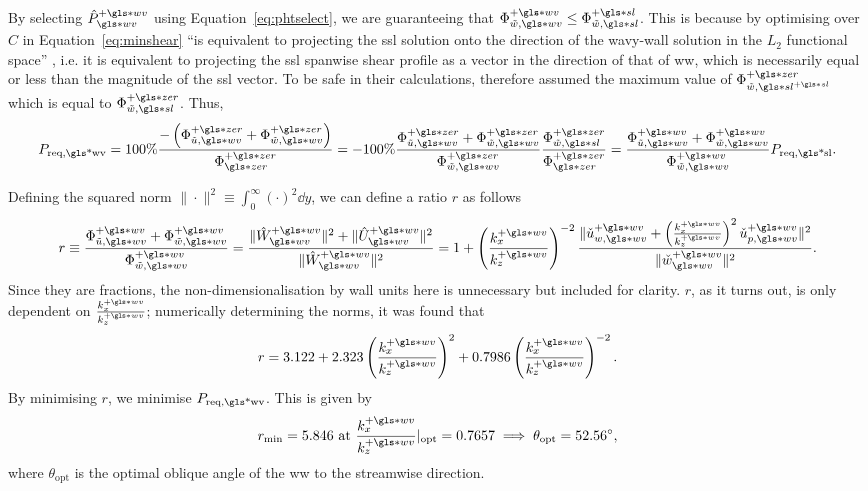 By selecting  $\hat{P}\ww\pw$ using Equation~\eqref{eq:phtselect}, we are guaranteeing that $\Phi _{\tilde{w},\gls*{wv}}\pw\leq\Phi _{\tilde{w},\gls*{sl}}\ps$. This is because by optimising over $C$ in Equation~\eqref{eq:minshear} ``is equivalent to projecting the \gls{ssl} solution onto the direction of the wavy-wall solution in the $L_2$ functional space'' \cite{chernyshenko2013}, i.e. it is equivalent to projecting the \gls{ssl} spanwise shear profile as a vector in the direction of that of \gls{ww}, which is necessarily equal or less than the magnitude of the \gls{ssl} vector. To be safe in their calculations, \textcite{chernyshenko2013} therefore assumed the maximum value of $\Phi _{\tilde{w},\gls*{sl}\ps}\pz$ which is equal to $\Phi _{\tilde{w},\gls*{sl}}\pz$. Thus,
\begin{equation}
	P_\text{req,\gls*{wv}} = 100\% \frac{-\left(\Phi _{\tilde{u},\gls*{wv}}\pz+\Phi _{\tilde{w},\gls*{wv}}\pz\right)}{\Phi \zz\pz}
	= -100\% \frac{\Phi _{\tilde{u},\gls*{wv}}\pz+\Phi _{\tilde{w},\gls*{wv}}\pz}{\Phi _{\tilde{w},\gls*{wv}}\pz}\frac{\Phi _{\tilde{w},\gls*{sl}}\pz}{\Phi \zz\pz}
	= \frac{\Phi _{\tilde{u},\gls*{wv}}\pw+\Phi _{\tilde{w},\gls*{wv}}\pw}{\Phi _{\tilde{w},\gls*{wv}}\pw}P_\text{req,\gls*{sl}}
.\end{equation}

Defining the squared norm $\|\cdot\|^2\equiv \int_{0}^{\infty} \left( \cdot \right) ^{2} \dd{y}  $, we can define a ratio $r$ as follows
\begin{equation}
	r\equiv\frac{\Phi _{\tilde{u},\gls*{wv}}\pw+\Phi _{\tilde{w},\gls*{wv}}\pw}{\Phi _{\tilde{w},\gls*{wv}}\pw}=\frac{\|\hat{W}\pw\ww\|^2+\|\hat{U}\pw\ww\|^2}{\|\hat{W}\pw\ww\|^2}=1+\left( \frac{k_x\pw}{k_z\pw} \right) ^{-2} \frac{\|\check{u}_{w,\gls*{wv}}\pw+\left( \frac{k_x\pw}{k_z\pw} \right) ^2 \check{u}_{p,\gls*{wv}}\pw\|^2}{\|\check{w}\ww\pw\|^2}
.\end{equation}
Since they are fractions, the non-dimensionalisation by wall units here is unnecessary but included for clarity. $r$, as it turns out, is only dependent on $\frac{k_x\pw}{k_z\pw}$; numerically determining the norms, it was found that
\begin{equation}
	r=3.122+2.323 \left( \frac{k_x\pw}{k_z\pw} \right) ^2+0.7986 \left( \frac{k_x\pw}{k_z\pw} \right) ^{-2} 
.\end{equation}
By minimising $r$, we minimise $P_\text{req,\gls*{wv}} $. This is given by
\begin{equation}
	r_\text{min} =5.846 \text{ at } \frac{k_x\pw}{k_z\pw}\rvert_\text{opt} = 0.7657 \implies \theta_\text{opt} = \ang{52.56}
,\end{equation}
where $\theta_\text{opt} $ is the optimal oblique angle of the \gls{ww} to the streamwise direction.

